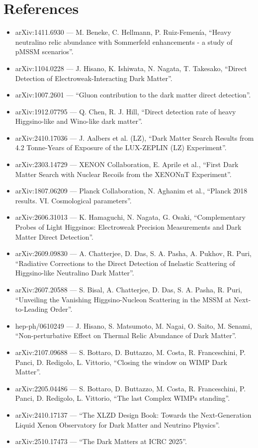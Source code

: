 \documentclass[11pt,a4paper]{article}
\begin{document}
\section*{References}
\begin{itemize}
\item arXiv:1411.6930 --- M. Beneke, C. Hellmann, P. Ruiz-Femen\'ia, ``Heavy neutralino relic abundance with Sommerfeld enhancements - a study of pMSSM scenarios''.
\item arXiv:1104.0228 --- J. Hisano, K. Ishiwata, N. Nagata, T. Takesako, ``Direct Detection of Electroweak-Interacting Dark Matter''.
\item arXiv:1007.2601 --- ``Gluon contribution to the dark matter direct detection''.
\item arXiv:1912.07795 --- Q. Chen, R. J. Hill, ``Direct detection rate of heavy Higgsino-like and Wino-like dark matter''.
\item arXiv:2410.17036 --- J. Aalbers et al. (LZ), ``Dark Matter Search Results from 4.2 Tonne-Years of Exposure of the LUX-ZEPLIN (LZ) Experiment''.
\item arXiv:2303.14729 --- XENON Collaboration, E. Aprile et al., ``First Dark Matter Search with Nuclear Recoils from the XENONnT Experiment''.
\item arXiv:1807.06209 --- Planck Collaboration, N. Aghanim et al., ``Planck 2018 results. VI. Cosmological parameters''.
\item arXiv:2606.31013 --- K. Hamaguchi, N. Nagata, G. Osaki, ``Complementary Probes of Light Higgsinos: Electroweak Precision Measurements and Dark Matter Direct Detection''.
\item arXiv:2609.09830 --- A. Chatterjee, D. Das, S. A. Pasha, A. Pukhov, R. Puri, ``Radiative Corrections to the Direct Detection of Inelastic Scattering of Higgsino-like Neutralino Dark Matter''.
\item arXiv:2607.20588 --- S. Bisal, A. Chatterjee, D. Das, S. A. Pasha, R. Puri, ``Unveiling the Vanishing Higgsino-Nucleon Scattering in the MSSM at Next-to-Leading Order''.
\item hep-ph/0610249 --- J. Hisano, S. Matsumoto, M. Nagai, O. Saito, M. Senami, ``Non-perturbative Effect on Thermal Relic Abundance of Dark Matter''.
\item arXiv:2107.09688 --- S. Bottaro, D. Buttazzo, M. Costa, R. Franceschini, P. Panci, D. Redigolo, L. Vittorio, ``Closing the window on WIMP Dark Matter''.
\item arXiv:2205.04486 --- S. Bottaro, D. Buttazzo, M. Costa, R. Franceschini, P. Panci, D. Redigolo, L. Vittorio, ``The last Complex WIMPs standing''.
\item arXiv:2410.17137 --- ``The XLZD Design Book: Towards the Next-Generation Liquid Xenon Observatory for Dark Matter and Neutrino Physics''.
\item arXiv:2510.17473 --- ``The Dark Matters at ICRC 2025''.
\end{itemize}
\end{document}
